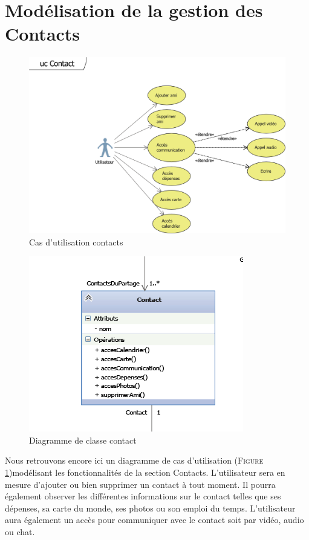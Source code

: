 \documentclass[11pt]{article}
\begin{document}
\section{Modélisation de la gestion des Contacts}
\begin{figure}[!h]
        \centering \includegraphics[scale=1]{ucContact.png}
        \caption{Cas d'utilisation contacts}
         \label{fig:ucContact}
\end{figure}
\begin{figure}[!h]
        \centering \includegraphics[scale=1]{contact.png}
        \caption{Diagramme de classe contact}
         \label{fig:contact}
\end{figure}
Nous retrouvons encore ici un diagramme de cas d’utilisation  (\textsc{Figure \ref{fig:ucContact}})modélisant les fonctionnalités de la section Contacts. L’utilisateur sera en mesure d’ajouter ou bien supprimer un contact à tout moment. Il pourra également observer les différentes informations sur le contact telles que ses dépenses, sa carte du monde, ses photos ou son emploi du temps. L’utilisateur aura également un accès pour communiquer avec le contact soit par vidéo, audio ou chat.
\end{document}
